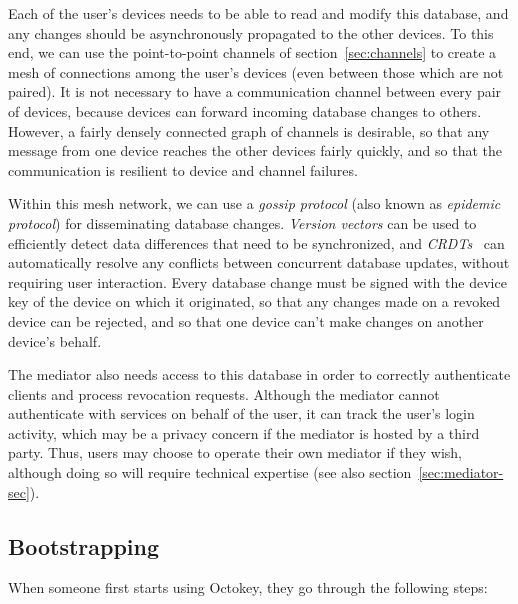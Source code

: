 Each of the user's devices needs to be able to read and modify this database, and any changes should
be asynchronously propagated to the other devices. To this end, we can use the point-to-point
channels of section~\ref{sec:channels} to create a mesh of connections among the user's devices
(even between those which are not paired). It is not necessary to have a communication channel
between every pair of devices, because devices can forward incoming database changes to others.
However, a fairly densely connected graph of channels is desirable, so that any message from one
device reaches the other devices fairly quickly, and so that the communication is resilient to
device and channel failures.

Within this mesh network, we can use a \emph{gossip protocol} (also known as \emph{epidemic
protocol}) \cite{Demers89} for disseminating database changes. \emph{Version vectors}
\cite{ParkerJr83} can be used to efficiently detect data differences that need to be synchronized,
and \emph{CRDTs}~\cite{Shapiro11} can automatically resolve any conflicts between concurrent
database updates, without requiring user interaction. Every database change must be signed with the
device key of the device on which it originated, so that any changes made on a revoked device can be
rejected, and so that one device can't make changes on another device's behalf.

The mediator also needs access to this database in order to correctly authenticate clients and
process revocation requests. Although the mediator cannot authenticate with services on behalf of
the user, it can track the user's login activity, which may be a privacy concern if the mediator is
hosted by a third party. Thus, users may choose to operate their own mediator if they wish, although
doing so will require technical expertise (see also section~\ref{sec:mediator-sec}).

\subsection{Bootstrapping}\label{sec:bootstrap}

When someone first starts using Octokey, they go through the following steps:

